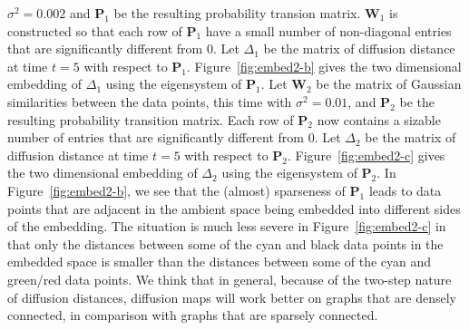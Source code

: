 $\sigma^{2} = 0.002$ and $\mathbf{P}_1$ be the resulting probability
transion matrix. $\mathbf{W}_1$ is constructed so that each row of
$\mathbf{P}_1$ have a small number of non-diagonal entries that are
significantly different from $0$. Let $\Delta_{1}$ be the matrix of
diffusion distance at time $t = 5$ with respect to
$\mathbf{P}_1$. Figure~\ref{fig:embed2-b} gives the two dimensional
embedding of $\Delta_{1}$ using the eigensystem of $\mathbf{P}_1$. Let
$\mathbf{W}_2$ be the matrix of Gaussian similarities between the data
points, this time with $\sigma^{2} = 0.01$, and $\mathbf{P}_2$ be the
resulting probability transition matrix. Each row of $\mathbf{P}_2$
now contains a sizable number of entries that are significantly
different from $0$. Let $\Delta_{2}$ be the matrix of diffusion
distance at time $t = 5$ with respect to
$\mathbf{P}_2$. Figure~\ref{fig:embed2-c} gives the two dimensional
embedding of $\Delta_{2}$ using the eigensystem of $\mathbf{P}_2$. In
Figure~\ref{fig:embed2-b}, we see that the (almost) sparseness of
$\mathbf{P}_1$ leads to data points that are adjacent in the ambient
space being embedded into different sides of the embedding. The
situation is much less severe in Figure~\ref{fig:embed2-c} in that
only the distances between some of the cyan and black data points in
the embedded space is smaller than the distances between some of the
cyan and green/red data points. We think that in general, because of
the two-step nature of diffusion distances, diffusion maps will work
better on graphs that are densely connected, in comparison with graphs
that are sparsely connected. 
